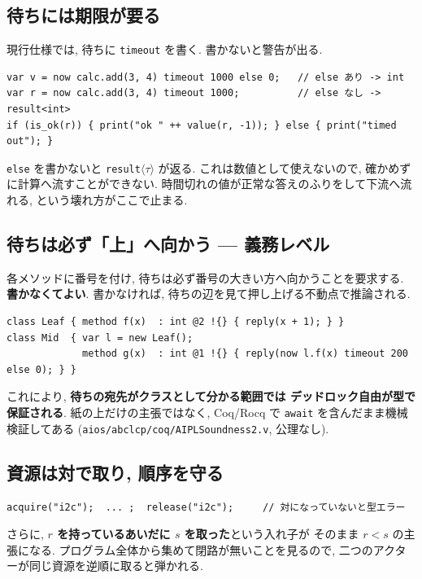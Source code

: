 \documentclass[11pt,a4paper]{article}
\begin{document}
\subsection{待ちには期限が要る}

現行仕様では, 待ちに \texttt{timeout} を書く. 書かないと警告が出る.

\begin{lstlisting}
var v = now calc.add(3, 4) timeout 1000 else 0;   // else あり -> int
var r = now calc.add(3, 4) timeout 1000;          // else なし -> result<int>
if (is_ok(r)) { print("ok " ++ value(r, -1)); } else { print("timed out"); }
\end{lstlisting}

\texttt{else} を書かないと \texttt{result}$\langle\tau\rangle$ が返る.
これは数値として使えないので, 確かめずに計算へ流すことができない.
時間切れの値が正常な答えのふりをして下流へ流れる,
という壊れ方がここで止まる.

\subsection{待ちは必ず「上」へ向かう --- 義務レベル}

各メソッドに番号を付け, 待ちは必ず番号の大きい方へ向かうことを要求する.
\textbf{書かなくてよい}. 書かなければ, 待ちの辺を見て押し上げる不動点で推論される.

\begin{lstlisting}
class Leaf { method f(x)  : int @2 !{} { reply(x + 1); } }
class Mid  { var l = new Leaf();
             method g(x)  : int @1 !{} { reply(now l.f(x) timeout 200 else 0); } }
\end{lstlisting}

これにより, \textbf{待ちの宛先がクラスとして分かる範囲では
デッドロック自由が型で保証される}. 紙の上だけの主張ではなく,
Coq/Rocq で \texttt{await} を含んだまま機械検証してある
(\texttt{aios/abclcp/coq/AIPLSoundness2.v}, 公理なし).

\subsection{資源は対で取り, 順序を守る}

\begin{lstlisting}
acquire("i2c");  ... ;  release("i2c");     // 対になっていないと型エラー
\end{lstlisting}

さらに, \textbf{$r$ を持っているあいだに $s$ を取った}という入れ子が
そのまま $r < s$ の主張になる. プログラム全体から集めて閉路が無いことを見るので,
二つのアクターが同じ資源を逆順に取ると弾かれる.
\end{document}
